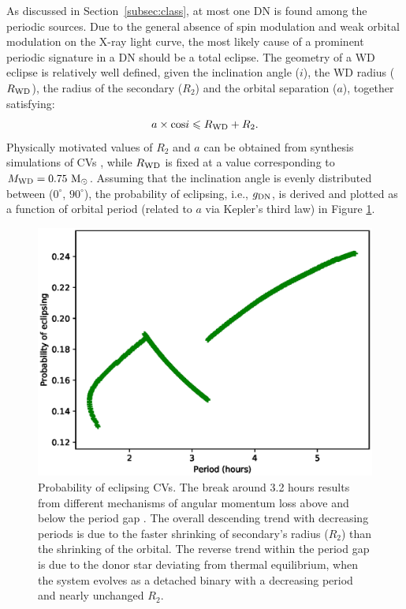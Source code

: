 \documentclass[fleqn,usenatbib]{mnras}
\begin{document}
As discussed in Section~\ref{subsec:class}, at most one DN is found among the periodic sources. Due to the general absence of spin modulation and weak orbital modulation on the X-ray light curve, the most likely cause of a prominent periodic signature in a DN should be a total eclipse. 
The geometry of a WD eclipse is relatively well defined, given the inclination angle ($i$), the WD radius ($R_{\rm WD}$), the radius of the secondary ($R_2$) and the orbital separation ($a$), together satisfying: 
\begin{equation}
{a \times {\rm cos}i}\leq {R_{\rm WD}+R_2}.
\end{equation}
Physically motivated values of $R_2$ and $a$ can be obtained from synthesis simulations of CVs \citep{2011ApJS..194...28K}, while $R_{\rm WD}$ is fixed at a value corresponding to $M_{\rm WD} = 0.75 {\rm~M_\odot}$.
Assuming that the inclination angle is evenly distributed between ($0^\circ$, $90^\circ$), the probability of eclipsing, i.e., $g_{\rm DN}$, is derived and plotted as a function of orbital period (related to $a$ via Kepler's third law) in Figure \ref{fig:simpCV}. 
\begin{figure}
\centering
\includegraphics[scale=0.55]{./figure/p_inCV.eps}
\caption{Probability of eclipsing CVs. The break around 3.2 hours results from different mechanisms of angular momentum loss above and below the period gap \citep{2011ApJS..194...28K}.
The overall descending trend with decreasing periods is due to the faster shrinking of secondary's radius ($R_2$) than the shrinking of the orbital.
The reverse trend within the period gap is due to the donor star deviating from thermal equilibrium, when the system evolves as a detached binary with a decreasing period and nearly unchanged $R_2$.
\label{fig:simpCV}}
\end{figure}
\end{document}
